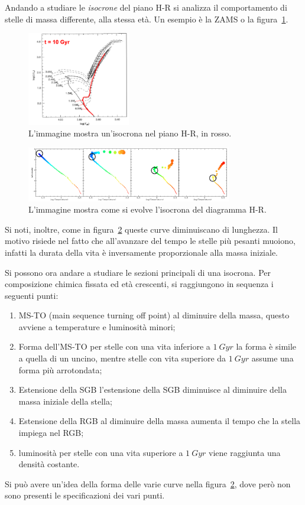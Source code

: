 Andando a studiare le \textit{isocrone} del piano H-R si analizza il comportamento di stelle di massa differente, alla stessa età. Un esempio è la ZAMS o la figura~\ref{fig:isocrona}.

\begin{figure}
    \centering
    \includegraphics[width = 0.4\textwidth]{immagini/HR-isocrona.png}
    \caption{L'immagine mostra un'isocrona nel piano H-R, in rosso.}\label{fig:isocrona}
\end{figure}
\begin{figure}
    \centering
    \includegraphics[width = 0.8\textwidth]{immagini/evoluzione-isocrona.png}
    \caption{L'immagine mostra come si evolve l'isocrona del diagramma H-R.}\label{fig:evoluzione-isocrona}
\end{figure}

Si noti, inoltre, come in figura~\ref{fig:evoluzione-isocrona} queste curve diminuiscano di lunghezza. Il motivo risiede nel fatto che all'avanzare del tempo le stelle più pesanti muoiono, infatti la durata della vita è inversamente proporzionale alla massa iniziale.

Si possono ora andare a studiare le sezioni principali di una isocrona. Per composizione chimica fissata ed età crescenti, si raggiungono in sequenza i seguenti punti:

\begin{enumerate}
    \item MS-TO (main sequence turning off point)\: al diminuire della massa, questo avviene a temperature e luminosità minori;
    \item Forma dell'MS-TO\: per stelle con una vita inferiore a $\SI{1}{Gyr}$ la forma è simile a quella di un uncino, mentre stelle con vita superiore da $\SI{1}{Gyr}$ assume una forma più arrotondata;
    \item Estensione della SGB\: l'estensione della SGB diminuisce al diminuire della massa iniziale della stella;
    \item Estensione della RGB\: al diminuire della massa aumenta il tempo che la stella impiega nel RGB;
    \item luminosità\: per stelle con una vita superiore a $\SI{1}{Gyr}$ viene raggiunta una densità costante.
\end{enumerate}
Si può avere un'idea della forma delle varie curve nella figura~\ref{fig:evoluzione-isocrona}, dove però non sono presenti le specificazioni dei vari punti.
